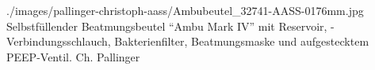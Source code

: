 {}
{}
{./images/pallinger-christoph-aass/Ambubeutel_32741-AASS-0176mm.jpg}
{Selbstfüllender Beatmungsbeutel
\enquote{Ambu{\texttrademark} Mark IV} mit Reservoir, -Verbindungsschlauch,
Bakterienfilter, Beatmungsmaske und aufgestecktem PEEP-Ventil.} {Ch.
Pallinger}


